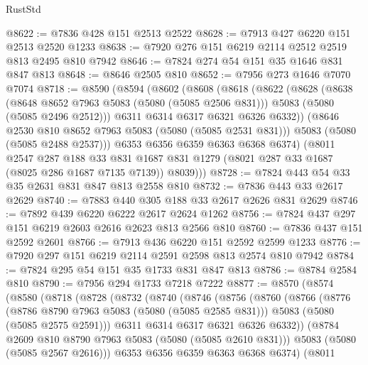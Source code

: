 \begin{lexlean}{RustStd}
\begin{coremodule}
@8622 := @7836 @428 @151 @2513 @2522
@8628 := @7913 @427 @6220 @151 @2513 @2520 @1233
@8638 := @7920 @276 @151 @6219 @2114 @2512 @2519 @813 @2495 @810 @7942
@8646 := @7824 @274 @54 @151 @35 @1646 @831 @847 @813
@8648 := @8646 @2505 @810
@8652 := @7956 @273 @1646 @7070 @7074
@8718 := @8590
    (@8594
      (@8602
        (@8608
          (@8618
            (@8622
              (@8628
                (@8638
                  (@8648 @8652 @7963 @5083 (@5080 (@5085 @2506 @831)))
                  @5083
                  (@5080 (@5085 @2496 @2512)))
                @6311
                @6314
                @6317
                @6321
                @6326
                @6332))
            (@8646 @2530 @810 @8652 @7963 @5083 (@5080 (@5085 @2531 @831)))
            @5083
            (@5080 (@5085 @2488 @2537)))
          @6353
          @6356
          @6359
          @6363
          @6368
          @6374)
        (@8011
          @2547
          @287
          @188
          @33
          @831
          @1687
          @831
          @1279
          (@8021 @287 @33 @1687 (@8025 @286 @1687 @7135 @7139))
          @8039)))
@8728 := @7824 @443 @54 @33 @35 @2631 @831 @847 @813 @2558 @810
@8732 := @7836 @443 @33 @2617 @2629
@8740 := @7883 @440 @305 @188 @33 @2617 @2626 @831 @2629
@8746 := @7892 @439 @6220 @6222 @2617 @2624 @1262
@8756 := @7824 @437 @297 @151 @6219 @2603 @2616 @2623 @813 @2566 @810
@8760 := @7836 @437 @151 @2592 @2601
@8766 := @7913 @436 @6220 @151 @2592 @2599 @1233
@8776 := @7920 @297 @151 @6219 @2114 @2591 @2598 @813 @2574 @810 @7942
@8784 := @7824 @295 @54 @151 @35 @1733 @831 @847 @813
@8786 := @8784 @2584 @810
@8790 := @7956 @294 @1733 @7218 @7222
@8877 := @8570
    (@8574
      (@8580
        (@8718
          (@8728
            (@8732
              (@8740
                (@8746
                  (@8756
                    (@8760
                      (@8766
                        (@8776
                          (@8786 @8790 @7963 @5083 (@5080 (@5085 @2585 @831)))
                          @5083
                          (@5080 (@5085 @2575 @2591)))
                        @6311
                        @6314
                        @6317
                        @6321
                        @6326
                        @6332))
                    (@8784 @2609 @810 @8790 @7963 @5083 (@5080 (@5085 @2610 @831)))
                    @5083
                    (@5080 (@5085 @2567 @2616)))
                  @6353
                  @6356
                  @6359
                  @6363
                  @6368
                  @6374)
                (@8011

\end{coremodule}
\end{lexlean}
